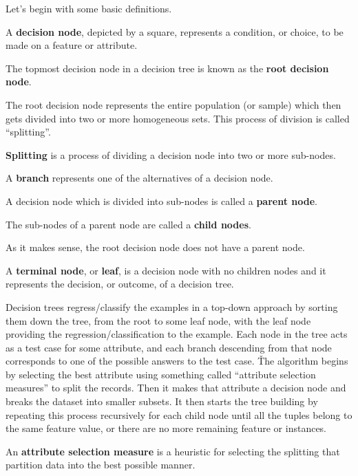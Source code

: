 Let's begin with some basic definitions.

A \textbf{decision node}, depicted by a square, represents a condition, or choice, to be made on a feature or attribute.
\ed

The topmost decision node in a decision tree is known as the \textbf{root decision node}.
\ed

The root decision node represents the entire population (or sample) which then gets divided into two or more homogeneous
sets. This process of division is called ``splitting''.

\bd[Splitting]
\textbf{Splitting} is a process of dividing a decision node into two or more sub-nodes.
\ed

\bd [Branch]
A \textbf{branch} represents one of the alternatives of a decision node.
\ed

A decision node which is divided into sub-nodes is called a \textbf{parent node}.
\ed

The sub-nodes of a parent node are called a \textbf{child nodes}.
\ed

As it makes sense, the root decision node does not have a parent node.

A \textbf{terminal node}, or \textbf{leaf}, is a decision node with no children nodes and it represents the decision,
or outcome, of a decision tree.
\ed


Decision trees regress/classify the examples in a top-down approach by sorting them down the tree, from the root to
some leaf node, with the leaf node providing the regression/classification to the example. Each node in the tree
acts as a test case for some attribute, and each branch descending from that node corresponds to one of the possible
answers to the test case. \v

The algorithm begins by selecting the best attribute using something called ``attribute selection measures'' to
split the records. Then it makes that attribute a decision node and breaks the dataset into smaller subsets. It then
starts the tree building by repeating this process recursively for each child node until all the tuples belong to
the same feature value, or there are no more remaining feature or instances.

An \textbf{attribute selection measure} is a heuristic for selecting the splitting that partition data into the best
possible manner.
\ed


